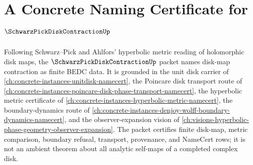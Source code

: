 \chapter{A Concrete Naming Certificate for $\SchwarzPickDiskContractionUp$}
\label{ch:concrete-instances-schwarz-pick-disk-contraction-namecert}

Following Schwarz--Pick and Ahlfors' hyperbolic metric reading of holomorphic disk maps, the $\SchwarzPickDiskContractionUp$ packet names disk-map contraction as finite BEDC data. It is grounded in the unit disk carrier of \autoref{ch:concrete-instances-unitdisk-namecert}, the Poincare disk transport route of \autoref{ch:concrete-instances-poincare-disk-phase-transport-namecert}, the hyperbolic metric certificate of \autoref{ch:concrete-instances-hyperbolic-metric-namecert}, the boundary-dynamics route of \autoref{ch:concrete-instances-denjoy-wolff-boundary-dynamics-namecert}, and the observer-expansion vision of \autoref{ch:visions-hyperbolic-phase-geometry-observer-expansion}. The packet certifies finite disk-map, metric comparison, boundary refusal, transport, provenance, and NameCert rows; it is not an ambient theorem about all analytic self-maps of a completed complex disk.

